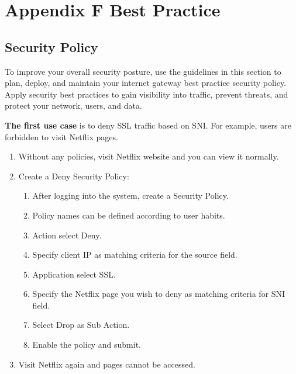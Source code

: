 %
\chapter*{\hypertarget{link:Appendix F Best Practice}{Appendix F Best Practice}}
\label{sec:appendix_f}

\section*{\hypertarget{link:Appendix Security Policy}{Security Policy}}
\label{sec:appendix_f:policy}

To improve your overall security posture, use the guidelines in this section to plan, deploy, and maintain your internet gateway best practice security policy. Apply security best practices to gain visibility into traffic, prevent threats, and protect your network, users, and data. 


\textbf{The first use case} is to deny SSL traffic based on SNI. For example, users are forbidden to visit Netflix pages.

\begin{description}[leftmargin=0pt,itemindent=0em]
    \item[] 
    \begin{enumerate}
        \item Without any policies, visit Netflix website and you can view it normally.
        \item	Create a Deny Security Policy:
        \begin{enumerate}
            \item 	After logging into the system, create a Security Policy.
            \item	Policy names can be defined according to user habits.
            \item	Action select Deny.
            \item	Specify client IP as matching criteria for the source field. 
            \item	Application select SSL.
            \item	Specify the Netflix page you wish to deny as matching criteria for SNI field.  
            \item	Select Drop as Sub Action.
            \item	Enable the policy and submit.
        \end{enumerate}
        \item	Visit Netflix again and pages cannot be accessed.
    \end{enumerate}	
\end{description}

